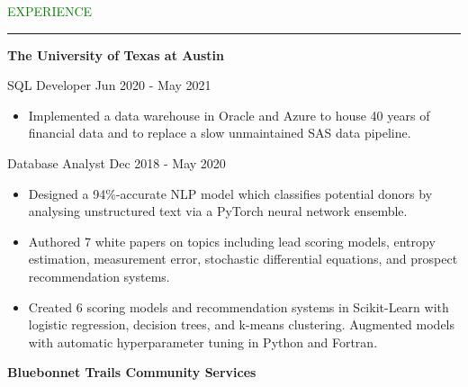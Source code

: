 \documentclass [
        11pt
] {article}
\begin{document}

\noindent\textcolor{green}{EXPERIENCE \rule{15.8cm}{1pt}}

\vspace*{10pt}

\noindent \textbf {The University of Texas at Austin}
\vspace*{5pt}

\noindent SQL Developer
\hspace*{\fill} Jun 2020 - May 2021

\begin{itemize}[itemsep=1pt,topsep=1pt]
\renewcommand{\labelitemi}{\scriptsize$\blacksquare$}


\item Implemented a data warehouse in Oracle and Azure to house 40 years of
financial data and to replace a slow unmaintained SAS data pipeline.

\end{itemize}


\noindent Database Analyst
\hspace*{\fill} Dec 2018 - May 2020

\begin{itemize}[itemsep=1pt,topsep=1pt]
\renewcommand{\labelitemi}{\scriptsize$\blacksquare$}

\item Designed a 94\%-accurate NLP model which classifies potential donors
by analysing unstructured text via a PyTorch neural network ensemble.

\item Authored 7 white papers on topics including lead scoring models, entropy
estimation, measurement error, stochastic differential equations, and prospect
recommendation systems.

\item Created 6 scoring models and recommendation systems in Scikit-Learn with
logistic regression, decision trees, and k-means clustering. Augmented models
with automatic hyperparameter tuning in Python and Fortran.

\end{itemize}

\vspace*{5pt}




\noindent \textbf{Bluebonnet Trails Community Services}
\vspace*{5pt}
\end{document}
